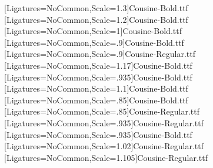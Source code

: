 \usepackage{amsmath}
\usepackage{mathspec}
\setmonofont[Ligatures=NoCommon,Scale=.9,SlantedFont={Cousine-Italic.ttf},BoldFont={Cousine-Bold.ttf},BoldSlantedFont={Cousine-BoldItalic.ttf}]{Cousine-Regular.ttf} %
\newfontface{\SecCode}[Ligatures=NoCommon,Scale=1.3]{Cousine-Bold.ttf}
\newfontface{\SubsecCode}[Ligatures=NoCommon,Scale=1.2]{Cousine-Bold.ttf}
\newfontface{\SubsubsecCode}[Ligatures=NoCommon,Scale=1]{Cousine-Bold.ttf}
\newfontface{\ParaCode}[Ligatures=NoCommon,Scale=.9]{Cousine-Bold.ttf}
\newfontface{\SubparaCode}[Ligatures=NoCommon,Scale=.9]{Cousine-Regular.ttf}
\newfontface{\RHCode}[Ligatures=NoCommon,Scale=1.17]{Cousine-Bold.ttf} %
\newfontface{\RHCodeEleven}[Ligatures=NoCommon,Scale=.935]{Cousine-Bold.ttf}
\newfontface{\RHCodeTwelve}[Ligatures=NoCommon,Scale=1.1]{Cousine-Bold.ttf}
\newfontface{\TOCCode}[Ligatures=NoCommon,Scale=.85]{Cousine-Bold.ttf}
\newfontface{\TOCCodeR}[Ligatures=NoCommon,Scale=.85]{Cousine-Regular.ttf}
\newfontface{\TOCCodeEleven}[Ligatures=NoCommon,Scale=.935]{Cousine-Regular.ttf}
\newfontface{\TOCCodeElevenB}[Ligatures=NoCommon,Scale=.935]{Cousine-Bold.ttf}
\newfontface{\TOCCodeTwelve}[Ligatures=NoCommon,Scale=1.02]{Cousine-Regular.ttf}
\newfontface{\TOCCodeThirteen}[Ligatures=NoCommon,Scale=1.105]{Cousine-Regular.ttf}

